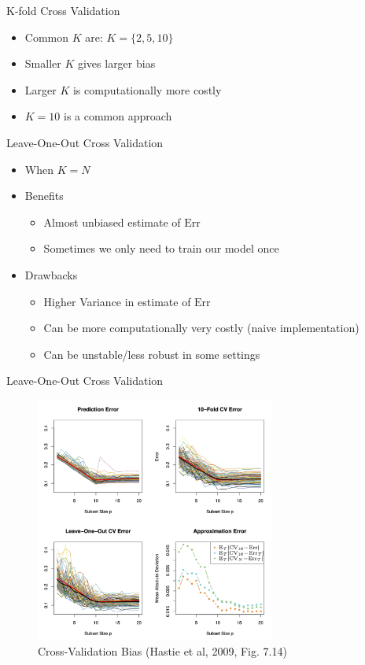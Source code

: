 \documentclass[10pt]{beamer}
\begin{document}
\begin{frame}{K-fold Cross Validation}

\begin{itemize}
\item Common $K$ are: $K=\{2,5,10\}$
\item Smaller $K$ gives larger bias
\item Larger $K$ is computationally more costly
\item $K=10$ is a common approach
\end{itemize}

\end{frame}


\begin{frame}{Leave-One-Out Cross Validation}

\begin{itemize}
\item When $K=N$
\item Benefits
\begin{itemize}
\item Almost unbiased estimate of $\text{Err}$
\item Sometimes we only need to train our model once
\end{itemize}
\item Drawbacks
\begin{itemize}
\item Higher Variance in estimate of $\text{Err}$
\item Can be more computationally very costly (naive implementation)
\item Can be unstable/less robust in some settings
\end{itemize}
\end{itemize}

\end{frame}


\begin{frame}{Leave-One-Out Cross Validation}

\begin{figure}[h]
\caption{Cross-Validation Bias (Hastie et al, 2009, Fig. 7.14)}
\centering
\includegraphics[width=0.7\textwidth]{figs/ESL_7_14.png}
\end{figure}

\end{frame}
\end{document}
